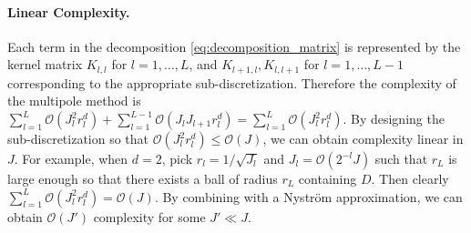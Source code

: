 \paragraph{Linear Complexity.}
Each term in the decomposition \eqref{eq:decomposition_matrix} is represented by the kernel matrix   \(K_{l,l}\) for $l = 1,\ldots, L $, and \(K_{l+1,l}, K_{l,l+1}\) for $l = 1, \ldots, L-1 $ corresponding to the appropriate sub-discretization.
Therefore the complexity of the multipole method is 
 $\sum_{l=1}^L \mathcal{O}(J^2_l r_l^d) + \sum_{l=1}^{L-1}\mathcal{O}(J_l J_{l+1} r_l^d) = \sum_{l=1}^L \mathcal{O}(J^2_l r_l^d)$.
By designing the sub-discretization so that $\mathcal{O}(J^2_l r_l^d) \leq \mathcal{O}(J)$, we can obtain  complexity linear in $J$. 
For example, when $d=2$, pick \(r_l = 1/\sqrt{J_l}\) and \(J_l = \mathcal{O}(2^{-l} J)\) such that \(r_L\) is large enough so that there exists a ball of radius \(r_L\) containing \(D\). Then clearly $\sum_{l=1}^L \mathcal{O}(J^2_l r_l^d) = \mathcal{O}(J)$. 
By combining with a Nystr\"om approximation, we can obtain $\mathcal{O}(J')$ complexity for some \(J' \ll J\).
